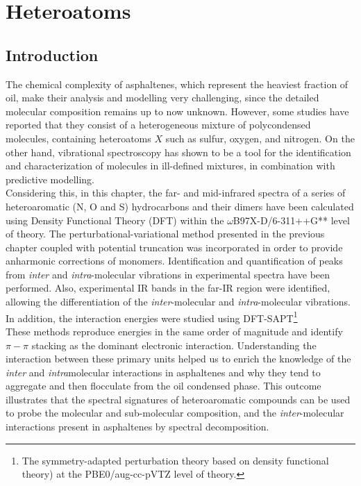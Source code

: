 \chapter[Heteroelements contribution: a vibrational study]{Heteroatoms}
\minitoc
\restoregeometry

\newpage
	
	
	\section*{Introduction}


The chemical complexity of asphaltenes, which represent the heaviest fraction of oil, make their analysis and modelling very challenging, since the detailed molecular composition remains up to now unknown. However, some studies have reported that they consist of a heterogeneous mixture of polycondensed molecules, containing heteroatoms $X$ such as sulfur, oxygen, and nitrogen. On the other hand, vibrational spectroscopy has shown to be a tool for the identification and characterization of molecules in ill-defined mixtures, in combination with predictive modelling.\\

Considering this, in this chapter, the far- and mid-infrared spectra of a series of heteroaromatic (N, O and S) hydrocarbons and their dimers have been calculated using Density Functional Theory (DFT) within the $\omega$B97X-D/6-311++G** level of theory. The perturbational-variational method presented in the previous chapter coupled with potential truncation was incorporated in order to provide anharmonic corrections of monomers. Identification and quantification of peaks from \textit{inter} and \textit{intra}-molecular vibrations in experimental spectra have been performed. Also, experimental IR bands in the far-IR region were identified, allowing the differentiation of the \textit{inter}-molecular and \textit{intra}-molecular vibrations. In addition, the interaction energies were studied using DFT-SAPT\footnote{The symmetry-adapted perturbation theory based on density functional theory) at the PBE0/aug-cc-pVTZ level of theory.} \\
	
	These methods reproduce energies in the same order of magnitude and identify $\pi-\pi$ stacking as the dominant electronic interaction. Understanding the interaction between these primary units helped us to enrich the knowledge of the \textit{inter} and \textit{intra}molecular interactions in asphaltenes and why they tend to aggregate and then flocculate from the oil condensed phase. This outcome illustrates that the spectral signatures of heteroaromatic compounds can be used to probe the molecular and sub-molecular composition, and the \textit{inter}-molecular interactions present in asphaltenes by spectral decomposition.\\
	
